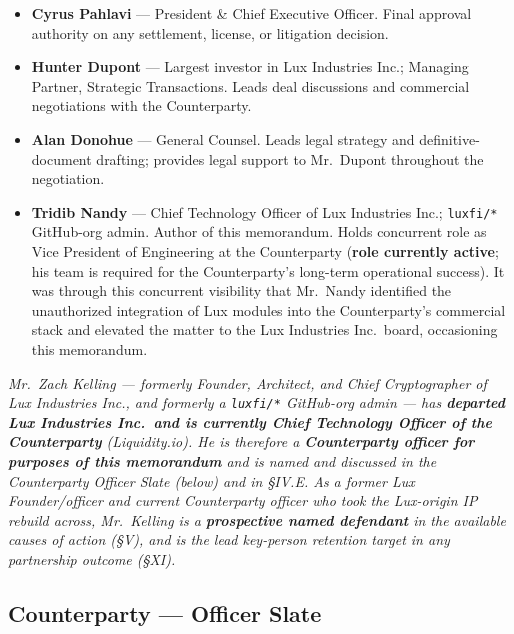 \documentclass[11pt,letterpaper]{article}
\begin{document}
\begin{itemize}[leftmargin=1.5em,itemsep=0.2em]
\item \textbf{Cyrus Pahlavi} --- President \& Chief Executive Officer.
Final approval authority on any settlement, license, or litigation
decision.
\item \textbf{Hunter Dupont} --- Largest investor in Lux Industries
Inc.; Managing Partner, Strategic Transactions. Leads deal discussions
and commercial negotiations with the Counterparty.
\item \textbf{Alan Donohue} --- General Counsel. Leads legal strategy
and definitive-document drafting; provides legal support to Mr.\
Dupont throughout the negotiation.
\item \textbf{Tridib Nandy} --- Chief Technology Officer of Lux Industries
Inc.; \texttt{luxfi/*} GitHub-org admin. Author of this memorandum.
Holds concurrent role as Vice President of Engineering at the
Counterparty (\textbf{role currently active}; his team is required
for the Counterparty's long-term operational success). It was through
this concurrent visibility that Mr.\ Nandy identified the unauthorized
integration of Lux modules into the Counterparty's commercial stack
and elevated the matter to the Lux Industries Inc.\ board, occasioning
this memorandum.
\end{itemize}

\textit{Mr.\ Zach Kelling --- formerly Founder, Architect, and Chief
Cryptographer of Lux Industries Inc., and formerly a \texttt{luxfi/*}
GitHub-org admin --- has \textbf{departed Lux Industries Inc.\ and is
currently Chief Technology Officer of the Counterparty}
(Liquidity.io). He is therefore a \textbf{Counterparty officer for
purposes of this memorandum} and is named and discussed in the
Counterparty Officer Slate (below) and in \S IV.E. As a former Lux
Founder/officer and current Counterparty officer who took the
Lux-origin IP rebuild across, Mr.\ Kelling is a \textbf{prospective
named defendant} in the available causes of action (\S V), and is
the lead key-person retention target in any partnership outcome
(\S XI).}

\subsection*{Counterparty --- Officer Slate}
\end{document}
